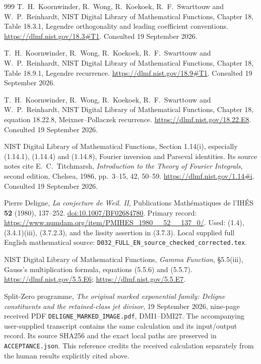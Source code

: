 \documentclass[11pt,a4paper]{article}
\begin{document}
\begin{thebibliography}{999}
T.\ H.\ Koornwinder, R.\ Wong, R.\ Koekoek, R.\ F.\ Swarttouw
and W.\ P.\ Reinhardt,
NIST Digital Library of Mathematical Functions,
Chapter 18, Table 18.3.1, Legendre orthogonality and leading
coefficient conventions.
\url{https://dlmf.nist.gov/18.3#T1}.
Consulted 19 September 2026.

T.\ H.\ Koornwinder, R.\ Wong, R.\ Koekoek, R.\ F.\ Swarttouw
and W.\ P.\ Reinhardt,
NIST Digital Library of Mathematical Functions,
Chapter 18, Table 18.9.1, Legendre recurrence.
\url{https://dlmf.nist.gov/18.9#T1}.
Consulted 19 September 2026.

T.\ H.\ Koornwinder, R.\ Wong, R.\ Koekoek, R.\ F.\ Swarttouw
and W.\ P.\ Reinhardt,
NIST Digital Library of Mathematical Functions,
Chapter 18, equation 18.22.8, Meixner--Pollaczek recurrence.
\url{https://dlmf.nist.gov/18.22.E8}.
Consulted 19 September 2026.

NIST Digital Library of Mathematical Functions,
Section 1.14(i), especially (1.14.1), (1.14.4) and (1.14.8),
Fourier inversion and Parseval identities.
Its source notes cite E.\ C.\ Titchmarsh,
\emph{Introduction to the Theory of Fourier Integrals},
second edition, Chelsea, 1986, pp.\ 3--15, 42, 50--59.
\url{https://dlmf.nist.gov/1.14#i}.
Consulted 19 September 2026.

Pierre Deligne, \emph{La conjecture de Weil. II}, Publications
Math\'ematiques de l'IH\'ES \textbf{52} (1980), 137--252.
\href{https://doi.org/10.1007/BF02684780}{doi:10.1007/BF02684780}.
Primary record:
\url{https://www.numdam.org/item/PMIHES_1980__52__137_0/}.
Used: (1.4), (3.4.1)(iii), (3.7.2.3), and the lissity assertion
in (3.7.3). Local supplied full English mathematical source:
\texttt{D032\_FULL\_EN\_source\_checked\_corrected.tex}.

NIST Digital Library of Mathematical Functions,
\emph{Gamma Function}, \S5.5(iii), Gauss's multiplication formula,
equations (5.5.6) and (5.5.7).
\url{https://dlmf.nist.gov/5.5.E6};
\url{https://dlmf.nist.gov/5.5.E7}.

Split-Zero programme, \emph{The original marked exponential family:
Deligne constituents and the retained-class jet divisor},
19 September 2026, nine-page received PDF
\texttt{DELIGNE\_MARKED\_IMAGE.pdf}, DMI1--DMI27.
The accompanying user-supplied transcript contains the same
calculation and its input/output record. Its source SHA256 and
the exact local paths are preserved in \texttt{ACCEPTANCE.json}.
This reference credits the received calculation separately from
the human results explicitly cited above.


\end{thebibliography}
\end{document}
